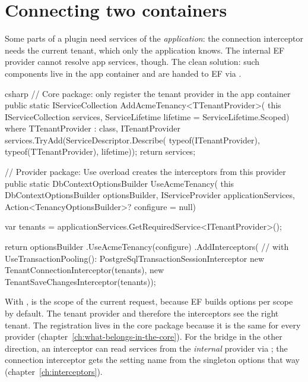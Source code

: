 \section{Connecting two containers}

Some parts of a plugin need services of the \emph{application}: the connection interceptor
needs the current tenant, which only the application knows. The internal EF provider cannot
resolve app services, though. The clean solution: such components live in the app container
and are handed to EF via .

\begin{sourcecode}{csharp}
// Core package: only register the tenant provider in the app container
public static IServiceCollection AddAcmeTenancy<TTenantProvider>(
    this IServiceCollection services,
    ServiceLifetime lifetime = ServiceLifetime.Scoped)
    where TTenantProvider : class, ITenantProvider
{
    services.TryAdd(ServiceDescriptor.Describe(
        typeof(ITenantProvider), typeof(TTenantProvider), lifetime));
    return services;
}

// Provider package: Use overload creates the interceptors from this provider
public static DbContextOptionsBuilder UseAcmeTenancy(
    this DbContextOptionsBuilder optionsBuilder,
    IServiceProvider applicationServices,
    Action<TenancyOptionsBuilder>? configure = null)
{
    var tenants = applicationServices.GetRequiredService<ITenantProvider>();

    return optionsBuilder
        .UseAcmeTenancy(configure)
        .AddInterceptors(
            // with UseTransactionPooling(): PostgreSqlTransactionSessionInterceptor
            new TenantConnectionInterceptor(tenants),
            new TenantSaveChangesInterceptor(tenants));
}
\end{sourcecode}

With
,  is the scope of the current
request, because EF builds options per scope by default. The tenant provider and therefore
the interceptors see the right tenant. The registration lives in the core package because it
is the same for every provider (chapter~\ref{ch:what-belongs-in-the-core}). For the bridge
in the other direction, an interceptor can read services from the \emph{internal} provider
via
;
the connection interceptor gets the setting name from the singleton options that way
(chapter~\ref{ch:interceptors}).


